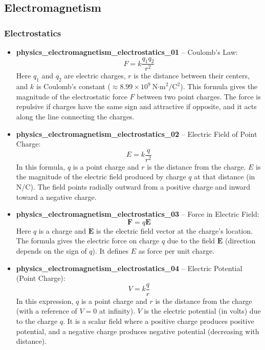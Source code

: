 \documentclass[11pt,a4paper]{article}
\begin{document}
\subsection{Electromagnetism}

\subsubsection{Electrostatics}

\begin{itemize}
\item \textbf{physics\_electromagnetism\_electrostatics\_01} -- Coulomb's Law: 
\[F = k\frac{q_1q_2}{r^2}\]
Here $q_1$ and $q_2$ are electric charges, $r$ is the distance between their centers, and $k$ is Coulomb's constant ($\approx 8.99\times10^9\ \text{N·m}^2/\text{C}^2$). This formula gives the magnitude of the electrostatic force $F$ between two point charges. The force is repulsive if charges have the same sign and attractive if opposite, and it acts along the line connecting the charges.

\item \textbf{physics\_electromagnetism\_electrostatics\_02} -- Electric Field of Point Charge: 
\[E = k\frac{q}{r^2}\]
In this formula, $q$ is a point charge and $r$ is the distance from the charge. $E$ is the magnitude of the electric field produced by charge $q$ at that distance (in N/C). The field points radially outward from a positive charge and inward toward a negative charge.

\item \textbf{physics\_electromagnetism\_electrostatics\_03} -- Force in Electric Field: 
\[\mathbf{F} = q\mathbf{E}\]
Here $q$ is a charge and $\mathbf{E}$ is the electric field vector at the charge's location. The formula gives the electric force on charge $q$ due to the field $\mathbf{E}$ (direction depends on the sign of $q$). It defines $E$ as force per unit charge.

\item \textbf{physics\_electromagnetism\_electrostatics\_04} -- Electric Potential (Point Charge): 
\[V = k\frac{q}{r}\]
In this expression, $q$ is a point charge and $r$ is the distance from the charge (with a reference of $V=0$ at infinity). $V$ is the electric potential (in volts) due to the charge $q$. It is a scalar field where a positive charge produces positive potential, and a negative charge produces negative potential (decreasing with distance).
\end{itemize}
\end{document}
